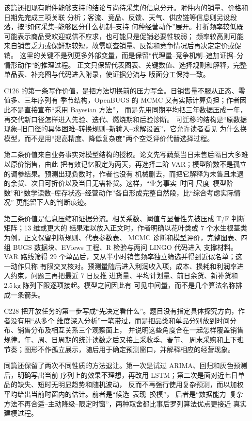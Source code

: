 \documentclass[UTF8,a4paper,12pt]{ctexart}
\begin{document}
该篇还把现有附件能够支持的结论与尚待采集的信息分开。附件内的销量、价格和日期先完成三项关联
分析；客流、竞品、反馈、天气、供应链等信息则另设段落，按“如何采集--能够区分什么机制--支持
何种经营动作”展开。打折频率较低既可能表示商品受欢迎或供不应求，也可能只是促销必要性较弱；
频率较高则可能来自销售乏力或保鲜期较短，故需联查销量、反馈和竞争情况后再决定定价或促销。
这里的关键不是列更多外部变量，而是保留“代理量--竞争机制--追加证据--分情形动作”的推理过程。
正文只保留代表图表、关键数值、选择规则和解释，完整单品表、补充图与代码进入附录，使证据分流与
版面分工保持一致。

C126 的第一条写作价值，是把方法切换前的压力写全。日销售量不服从正态、零值多、三年序列有
季节结构，OpenBUGS 的 MCMC 又有实际计算负担；作者因此不是直接宣布“采用 Bayesian 方法”，
而是先用同期平均把三年数据压成一年，再交代新口径怎样进入先验、迭代、燃烧期和后验诊断。
可迁移的结构是“原数据现象--旧口径的具体困难--转换规则--新输入--求解设置”，它允许读者看见
为什么换模型，而不是用“提高精度、降低复杂度”两个空泛评价代替选择过程。

第二条价值来自业务事实对模型结构的授权。论文先写蔬菜当日未售后隔日大多难以原价销售，由此
把有效记忆限定为两天，再选择二阶 VAR；模型阶数不是孤立的调参结果。预测出现负数时，作者也没有
机械删去，而把它解释为未售且未退的余货、次日可折价以及当日无需补货。这样，“业务事实--时间
尺度--模型阶数”和“数学读数--库存状态--经营动作”各自形成完整自然段，比“综合考虑实际情况”
更能留下人的判断痕迹。

第三条价值是信息压缩和证据分流。相关系数、阈值与显著性先被压成 T/F 判断矩阵；13 维或更大的
结果难以放入正文时，作者明确以花叶类或 7 个水生根茎类为例，正文保留判断规则、代表参数表、
MCMC 诊断和模型评价，完整图表、四组 BUGS 数据块、EViews 工程、R 检验与两问 LINGO 代码进入
支撑材料。VAR 路线筛得 29 个单品后，又从半小时销售频率独立筛选并得到近似名单；这一动作只称
有限交叉核对。预测量随后进入利润收入项，成本、损耗和利润率进入约束，问题三再把最近 7 日反推
进货量、平均计划量、前日余货、新补货和 $2.5\,\mathrm{kg}$ 陈列下限逐项接起。模型之间因此有
可见中间量，而不是几个算法名称排成一条箭头。

C228 把开放任务的第一步写成“先决定看什么”。题目没有指定具体探究方向，作者没有用“从多个
维度深入分析”一笔带过，而是把品类和单品分别放到时间分布、销售分布及相互关系三个观察面上，
并说明这些角度合在一起怎样覆盖销售规律。年、周、日周期的统计读数之后又接上采收季、春节、
周末采购和上下班节奏；图形不作孤立展示，随后用于确定预测窗口，并解释相应的经营现象。

同篇还保留了两次不同性质的方法退让。第一次是试过 ARIMA、回归和灰色预测后，明确写出当前
序列上的效果不理想，再改用 LSTM；第二次是面对近七日单品的缺失、短时无明显趋势和随机波动，
反而不再强行使用复杂预测，而以加权平均给出当前时窗内的估计。前者是“候选--表现--换模”，
后者是“数据能力--复杂方法不再合适--主动降级--限定时窗”，两种取舍都比事后罗列算法优点更接近
真实建模过程。
\end{document}
